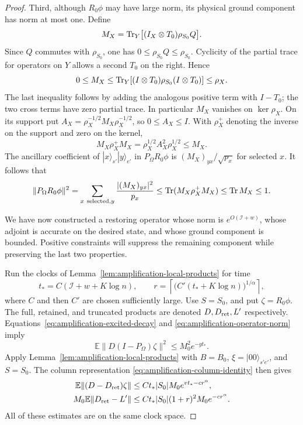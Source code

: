 \begin{proof}
Third, although $R_0\phi$ may have large norm, its physical ground
component has norm at most one.  Define
\[
 M_X=\operatorname{Tr}_Y\bigl[(I_X\otimes T_0)\rho_{S_0}Q\bigr].
\]
Since $Q$ commutes with $\rho_{S_0}$, one has
$0\le\rho_{S_0}Q\le\rho_{S_0}$.
Cyclicity of the partial trace for operators on $Y$ allows a second
$T_0$ on the right.  Hence
\[
 0\le M_X\le\operatorname{Tr}_Y[(I\otimes T_0)\rho_{S_0}(I\otimes T_0)]
 \le\rho_X.
\]
The last inequality follows by adding the analogous positive term
with $I-T_0$; the two cross terms have zero partial trace.
In particular $M_X$ vanishes on $\ker\rho_X$.  On its support put
$A_X=\rho_X^{-1/2}M_X\rho_X^{-1/2}$, so $0\le A_X\le I$.
With $\rho_X^+$ denoting the inverse on the support and zero on the
kernel,
\[
 M_X\rho_X^+M_X
 =\rho_X^{1/2}A_X^2\rho_X^{1/2}\le M_X.
\]
The ancillary coefficient of $|x\rangle_{s'}|y\rangle_{e'}$
in $P_\Omega R_0\phi$ is $(M_X)_{yx}/\sqrt{p_x}$ for selected
$x$.  It follows that
\begin{equation}\label{eq:amplification-ground-component}
 \|P_\Omega R_0\phi\|^2
 =\sum_{x\ {\rm selected},y}\frac{|(M_X)_{yx}|^2}{p_x}
 \le\operatorname{Tr}(M_X\rho_X^+M_X)\le\operatorname{Tr} M_X\le1.
\end{equation}

We have now constructed a restoring operator whose norm is
$e^{O(\mathcal I+w)}$, whose adjoint is accurate on the desired
state, and whose ground component is bounded.  Positive constraints
will suppress the remaining component while preserving the last two
properties.

Run the clocks of Lemma~\ref{lem:amplification-local-products} for
time
\begin{equation}\label{eq:amplification-time-choice}
 t_*=C(\mathcal I+w+K\log n),\qquad
 r=\left\lceil\bigl(C'(t_*+K\log n)\bigr)^{1/\alpha}\right\rceil,
\end{equation}
where $C$ and then $C'$ are chosen sufficiently large.  Use $S=S_0$,
and put $\zeta=R_0\phi$.  The full, retained, and truncated products
are denoted $D,D_{\rm ret},L'$ respectively.
Equations~\eqref{eq:amplification-excited-decay} and
\eqref{eq:amplification-operator-norm} imply
\[
 \mathbb E\|D(I-P_\Omega)\zeta\|^2
 \le M_0^2e^{-gt_*}.
\]
Apply Lemma~\ref{lem:amplification-local-products} with
$B=B_0$, $\xi=|00\rangle_{s'e'}$, and $S=S_0$.
The column representation \eqref{eq:amplification-column-identity}
then gives
\begin{align*}
 \mathbb E\|(D-D_{\rm ret})\zeta\|
 &\le Ct_*|S_0|M_0e^{vt_*-cr^\alpha},\\
 M_0\mathbb E\|D_{\rm ret}-L'\|
 &\le Ct_*|S_0|(1+r)^2M_0e^{-cr^\alpha}.
\end{align*}
All of these estimates are on the same clock space.


\end{proof}
